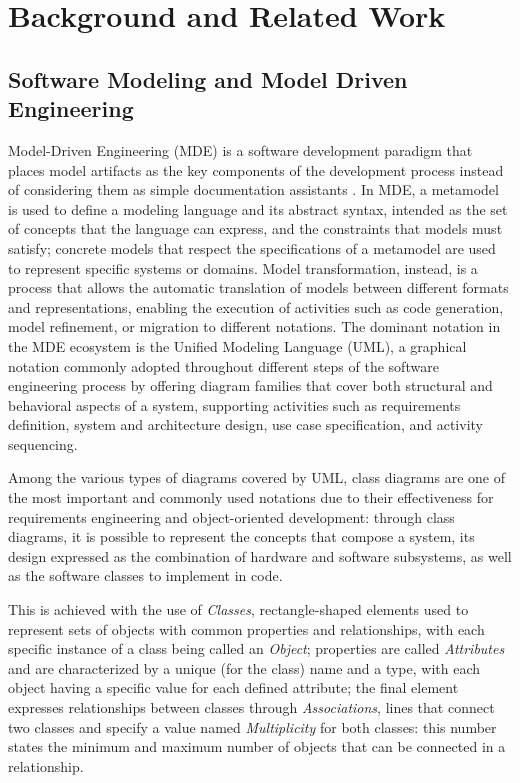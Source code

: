 \chapter{Background and Related Work}
\label{ch2}

\graphicspath{{Chapter2/}}

\section{Software Modeling and Model Driven Engineering}
\label{sec:back_mde}

Model-Driven Engineering (MDE) is a software development paradigm that places model artifacts as the key components of the development process instead of considering them as simple documentation assistants \cite{schmidt2006mde}. In MDE, a metamodel is used to define a modeling language and its abstract syntax, intended as the set of concepts that the language can express, and the constraints that models must satisfy; concrete models that respect the specifications of a metamodel are used to represent specific systems or domains. Model transformation, instead, is a process that allows the automatic translation of models between different formats and representations, enabling the execution of activities such as code generation, model refinement, or migration to different notations. The dominant notation in the MDE ecosystem is the Unified Modeling Language (UML), a graphical notation commonly adopted throughout different steps of the software engineering process by offering diagram families that cover both structural and behavioral aspects of a system, supporting activities such as requirements definition, system and architecture design, use case specification, and activity sequencing. 

Among the various types of diagrams covered by UML, class diagrams are one of the most important and commonly used notations due to their effectiveness for requirements engineering and object-oriented development: through class diagrams, it is possible to represent the concepts that compose a system, its design expressed as the combination of hardware and software subsystems, as well as the software classes to implement in code.

This is achieved with the use of \textit{Classes}, rectangle-shaped elements used to represent sets of objects with common properties and relationships, with each specific instance of a class being called an \textit{Object}; properties are called \textit{Attributes} and are characterized by a unique (for the class) name and a type, with each object having a specific value for each defined attribute; the final element expresses relationships between classes through \textit{Associations}, lines that connect two classes and specify a value named \textit{Multiplicity} for both classes: this number states the minimum and maximum number of objects that can be connected in a relationship.


